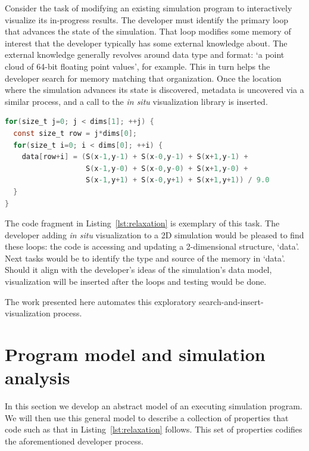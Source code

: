 Consider the task of modifying an existing simulation program to
interactively visualize its in-progress results.  The developer must
identify the primary loop that advances the state of the simulation.
That loop modifies some memory of interest that the developer typically
has some external knowledge about.  The external knowledge generally
revolves around data type and format: `a point cloud of 64-bit floating
point values', for example.  This in turn helps the developer search
for memory matching that organization.  Once the location where the
simulation advances its state is discovered, metadata is uncovered via
a similar process, and a call to the \textit{in situ} visualization
library is inserted.

\begin{lstlisting}[float=*,label=lst:relaxation,language=C,caption=A code
fragment representative of simulation software.  A large array is smoothed
using
a set of nested loops. \texttt{S} is presumed to be a macro that
samples \texttt{data} while properly accounting for edge cases.]
for(size_t j=0; j < dims[1]; ++j) {
  const size_t row = j*dims[0];
  for(size_t i=0; i < dims[0]; ++i) {
    data[row+i] = (S(x-1,y-1) + S(x-0,y-1) + S(x+1,y-1) +
                   S(x-1,y-0) + S(x-0,y-0) + S(x+1,y-0) +
                   S(x-1,y+1) + S(x-0,y+1) + S(x+1,y+1)) / 9.0
  }
}
\end{lstlisting}

The code fragment in Listing~\ref{lst:relaxation} is exemplary of this
task.
The developer adding \textit{in situ} visualization to a 2D
simulation would be pleased to find these loops: the code is accessing
and updating a 2-dimensional structure, `data'.  Next tasks would
be to identify the type and source of the memory in `data'.  Should
it align with the developer's ideas of the simulation's data model,
visualization will be inserted after the loops and testing would be
done.

The work presented here automates this exploratory
search-and-insert-visualization process.

\section{Program model and simulation analysis}
\label{sec:model}

In this section we develop an abstract model of an executing simulation
program.  We will then use this general model to describe a collection
of properties that code such as that in Listing~\ref{lst:relaxation}
follows.  This set of properties codifies the aforementioned developer
process.

